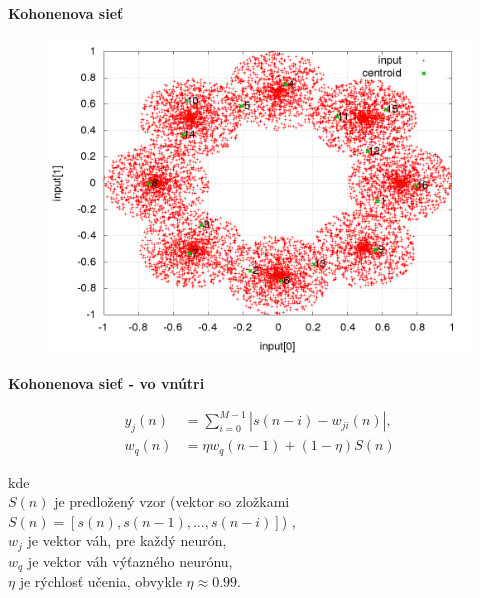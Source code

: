 \documentclass[xcolor=dvipsnames]{beamer}
\begin{document}
\begin{frame}{\bf Kohonenova sieť}

\begin{figure}[ht]
\begin{center}
\begin{minipage}{0.8\linewidth}
\begin{center}
\includegraphics[width=1.0\textwidth]{kohonen_test/learing_result.png}
\end{center}
\end{minipage}
\end{center}
\end{figure}

\end{frame}


\begin{frame}{\bf Kohonenova sieť - vo vnútri}

\begin{eqnarray}
\label{neuron_transfer}
y_j(n) &= \sum_{i = 0}^{M-1} {|s(n-i) - w_{ji}(n)|}, \\
w_q(n) &= \eta w_q(n-1) + (1 - \eta)S(n)
\end{eqnarray}

kde \\
$S(n)$ je predložený vzor (vektor so zložkami $S(n) = [s(n), s(n-1), ... , s(n-i)]$) ,\\
$w_j$ je vektor váh, pre každý neurón, \\
$w_q$ je vektor váh výťazného neurónu, \\
$\eta$ je rýchlosť učenia, obvykle $\eta \approx 0.99$.

\end{frame}
\end{document}
